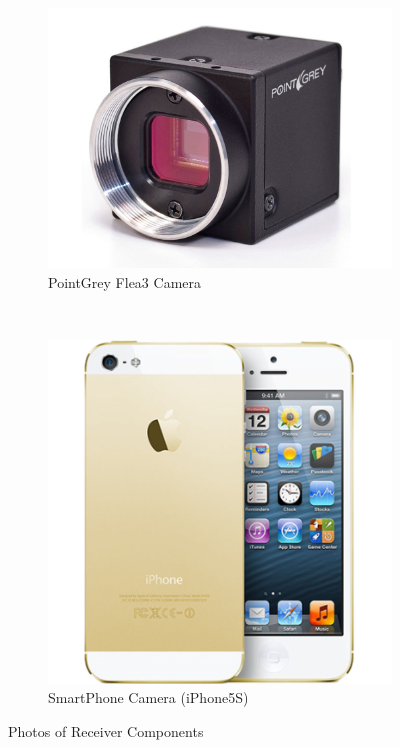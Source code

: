 \begin{figure}[!htb]
\centering
 \begin{subfigure}[h]{0.2\textwidth}
  \includegraphics[width=\textwidth]{fig/flea3.jpg} 
  \caption{PointGrey Flea3 Camera} \label{fig:flea}
 \end{subfigure}
~
 \begin{subfigure}[h]{0.2\textwidth}
  \includegraphics[width=\textwidth]{fig/iphone5s.png} 
  \caption{SmartPhone Camera (iPhone5S)} \label{fig:iphone5s}
 \end{subfigure}
\caption{Photos of Receiver Components}
\label{fig:rx_photo}
\end{figure}

